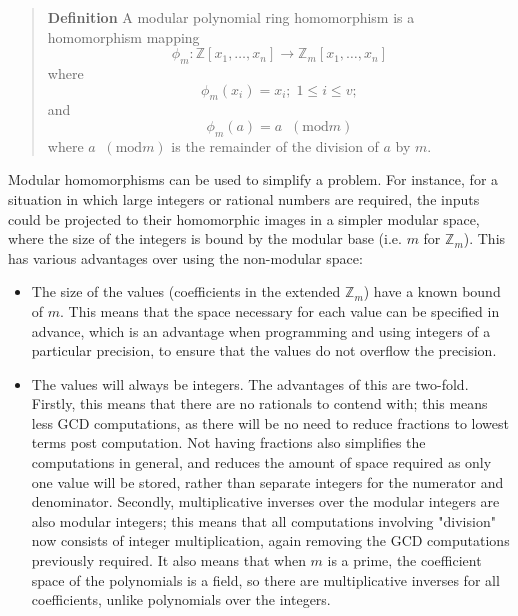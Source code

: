 \documentclass[letterpaper,12pt,titlepage,oneside,final]{book}
\newenvironment{defn}{\begin{quote}%
  \textbf{Definition }%
  \quad
}{%
\end{quote}%
}
\begin{document}
\begin{defn}\label{Modular Homom}
  A modular polynomial ring homomorphism is a homomorphism mapping
  \begin{equation*}\phi_m : \mathbb{Z}[x_1, \ldots, x_n] \rightarrow \mathbb{Z}_m[x_1, \ldots, x_n]\end{equation*} where 
  \begin{equation*}
  \phi_m(x_i) = x_i; \; 1 \leq i \leq v;
  \end{equation*}
  and
  \begin{equation*}
  \phi_m(a) = a \;\;(\textrm{mod} m)
  \end{equation*}
  where ${a \;\;(\textrm{mod} m)}$ is the remainder of the division of ${a}$ by ${m}$.
\end{defn}

Modular homomorphisms can be used to simplify a problem.  For instance, for a situation in which large integers or rational numbers are required, the inputs could be projected to their homomorphic images in a simpler modular space, where the size of the integers is bound by the modular base (i.e. ${m}$ for ${\mathbb{Z}_m}$).  This has various advantages over using the non-modular space:
\begin{itemize}
  \item The size of the values (coefficients in the extended ${\mathbb{Z}_m}$) have a known bound of ${m}$.  This means that the space necessary for each value can be specified in advance, which is an advantage when programming and using integers of a particular precision, to ensure that the values do not overflow the precision.
  \item The values will always be integers.  The advantages of this are two-fold.  Firstly, this means that there are no rationals to contend with; this means less GCD computations, as there will be no need to reduce fractions to lowest terms post computation.  Not having fractions also simplifies the computations in general, and reduces the amount of space required as only one value will be stored, rather than separate integers for the numerator and denominator.  Secondly, multiplicative inverses over the modular integers are also modular integers; this means that all computations involving "division" now consists of integer multiplication, again removing the GCD computations previously required.  It also means that when ${m}$ is a prime, the coefficient space of the polynomials is a field, so there are multiplicative inverses for all coefficients, unlike polynomials over the integers.
\end{itemize}
\end{document}
